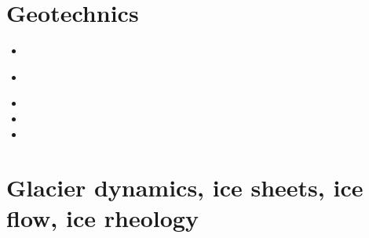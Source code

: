 \section{Geotechnics}

\begin{scriptsize}
\begin{itemize}
\item[\nineteenninetynine] 
\item[\twothousandthree] 
 \\
\item[\twothousandfour] 
\item[\twothousandsix] 
\item[\twothousandfourteen] 
\end{itemize}
\end{scriptsize}

\section{Glacier dynamics, ice sheets, ice flow, ice rheology}

